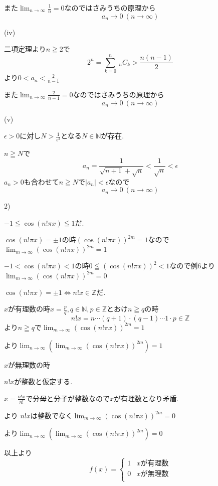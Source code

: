 \documentclass{jsarticle}
\begin{document}
       また$\displaystyle\lim_{n\to \infty}\frac{1}{n}=0$なのではさみうちの原理から
       \[a_n\to 0 \ (n\to \infty)\]
       
       (iv)
       
       二項定理より$n\geqq 2$で
       \[2^n =\sum_{k=0}^n \ _nC_k > \frac{n(n-1)}{2}\]
       より$0<a_n<\frac{2}{n-1}$
       
       また$\displaystyle\lim_{n\to \infty}\frac{2}{n-1}=0$なのではさみうちの原理から
       \[a_n\to 0 \ (n\to \infty)\]
       
       (v)
       
       $\epsilon > 0$に対し$N>\frac{1}{\epsilon ^2}$となる$N\in \mathbb{N}$が存在.
       
       $n\geqq N$で
       \[a_n=\frac{1}{\sqrt{n+1}+\sqrt{n}}<\frac{1}{\sqrt{n}}<\epsilon\]
       $a_n>0$も合わせて$n\geqq N$で$|a_n|<\epsilon$なので
       \[a_n\to 0 \ (n\to \infty)\]
       
       2)
       
       $-1\leqq \cos(n!\pi x) \leqq 1$だ.
       
       $\cos(n!\pi x) = \pm 1$の時$(\cos(n!\pi x))^{2m} = 1$なので$\displaystyle\lim_{m\to \infty} (\cos(n!\pi x))^{2m} = 1$
       
       $-1<\cos(n!\pi x) < 1$の時$0 \leqq (\cos(n!\pi x))^2 < 1$なので例6より$\displaystyle \lim_{m\to \infty} (\cos(n!\pi x))^{2m} = 0$
       
       $\cos(n!\pi x) = \pm 1\Leftrightarrow n!x \in \mathbb{Z} $だ.
       
       $x$が有理数の時$x=\frac{p}{q},q\in \mathbb{N},p\in \mathbb{Z}$とおけ$n\geqq q$の時
       \[n!x = n\cdots (q+1)\cdot (q-1) \cdots  1 \cdot p \in \mathbb{Z}\]
       より$n\geqq q$で$\displaystyle\lim_{m\to \infty} (\cos(n!\pi x))^{2m} = 1$
       
       より$\displaystyle\lim_{n\to \infty}(\lim_{m\to \infty} (\cos(n!\pi x))^{2m}) = 1$
       
       $x$が無理数の時
       
       $n!x$が整数と仮定する.
       
       $x=\frac{n!x}{n!}$で分母と分子が整数なので$x$が有理数となり矛盾.
       
       より
       $n!x$は整数でなく$\displaystyle\lim_{m\to \infty} (\cos(n!\pi x))^{2m} = 0$
       
       より$\displaystyle\lim_{n\to \infty}(\lim_{m\to \infty} (\cos(n!\pi x))^{2m}) = 0$
       
       以上より
       \[f(x) = \begin{cases}
       1 & xが有理数 \\
       0 & xが無理数 \\
       \end{cases}\]
       
\end{document}
